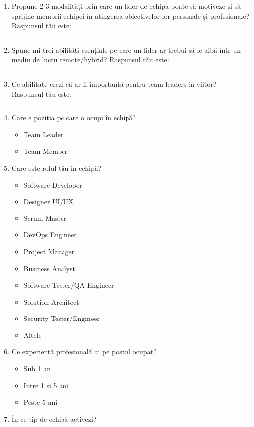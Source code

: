 \documentclass[a4paper, 12pt]{article}
\makeatletter
\newcommand*{\radiobutton}{\@ifstar{\radiobuttonON}{\radiobuttonOFF}}
\def\radiobuttonON{\raisebox{-1.5pt}{\stackinset{c}{}{c}{.35pt}{$\bullet$}{\scalebox{2}{$\circ$}}}}
\def\radiobuttonOFF{\raisebox{-1.5pt}{\scalebox{2}{$\circ$}}}
\makeatother
\begin{document}
\begin{enumerate}
		\item Propune 2-3 modalități prin care un lider de echipa poate să motiveze și să sprijine membrii echipei în atingerea obiectivelor lor personale și profesionale?
			\newline
			Raspunsul tău este: \rule{27.25em}{0.15mm}
		\item Spune-mi trei abilități esențiale pe care un lider ar trebui să le aibă într-un mediu de lucru remote/hybrid?
			\newline
			 Raspunsul tău este: \rule{27.25em}{0.15mm}
		\item Ce abilitate crezi că ar fi importantă pentru team leaders în viitor?
			\newline
			Raspunsul tău este: \rule{27.25em}{0.15mm}
		\item Care e poziția pe care o ocupi în echipă?
			\begin{itemize}
				\item[\radiobutton] Team Leader
				\item[\radiobutton] Team Member
			\end{itemize}
		\item Care este rolul tău în echipă?
			\begin{itemize}
				\item[\radiobutton] Software Developer
				\item[\radiobutton] Designer UI/UX
				\item[\radiobutton] Scrum Master
				\item[\radiobutton] DevOps Engineer
				\item[\radiobutton] Project Manager
				\item[\radiobutton] Business Analyst
				\item[\radiobutton] Software Tester/QA Engineer
				\item[\radiobutton] Solution Architect
				\item[\radiobutton] Security Tester/Engineer
				\item[\radiobutton] Altele
			\end{itemize}
		\item Ce experiență profesională ai pe postul ocupat?
			\begin{itemize}
				\item[\radiobutton] Sub 1 an
				\item[\radiobutton] Intre 1 și 5 ani
				\item[\radiobutton] Peste 5 ani
			\end{itemize}
		\item În ce tip de echipă activezi?

\end{enumerate}
\end{document}
